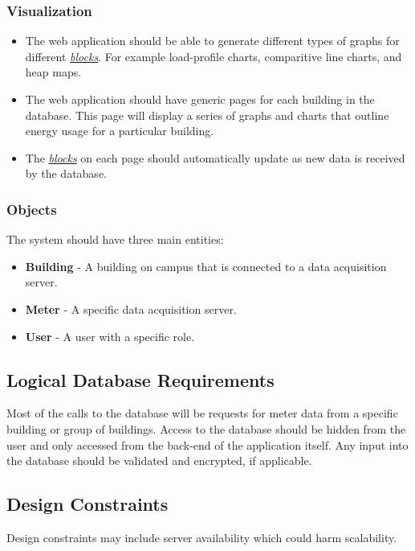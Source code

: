 \documentclass[onecolumn, draftclsnofoot,10pt, compsoc]{IEEEtran}
\begin{document}
    \subsubsection{Visualization}
    \begin{itemize}
        \item The web application should be able to generate different types of graphs for different \hyperref[definition]{\textit{blocks}}. For example load-profile charts, comparitive line charts, and heap maps.
        \item The web application should have generic pages for each building in the database. This page will display a series of graphs and charts that outline energy usage for a particular building.
        \item The \hyperref[definition]{\textit{blocks}} on each page should automatically update as new data is received by the database.
    \end{itemize}
    \subsubsection{Objects}
        The system should have three main entities: 
        \begin{itemize}
            \item \textbf{Building} - A building on campus that is connected to a data acquisition server.
            \item \textbf{Meter} - A specific data acquisition server.
            \item \textbf{User} - A user with a specific role.
        \end{itemize}
        
    \subsection{Logical Database Requirements}
    Most of the calls to the database will be requests for meter data from a specific building or group of buildings. Access to the database should be hidden from the user and only accessed from the back-end of the application itself. Any input into the database should be validated and encrypted, if applicable. 
    
    \subsection{Design Constraints}
    Design constraints may include server availability which could harm scalability.
\end{document}
